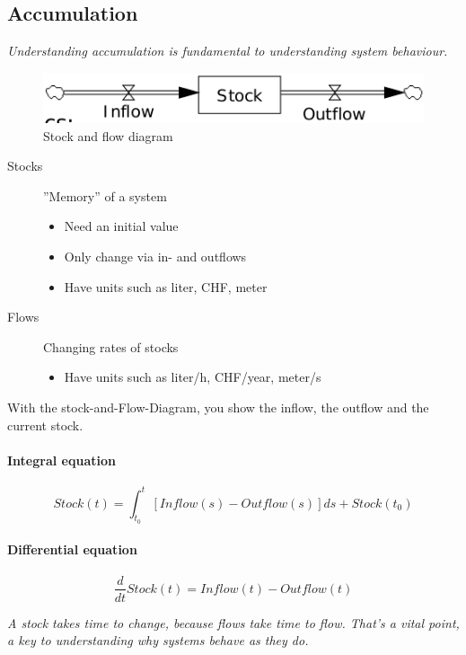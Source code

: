 \subsection{Accumulation}

\emph{Understanding accumulation is fundamental to understanding system
	behaviour.}

\begin{figure}[H]
	\centering
	\includegraphics[width=.5\textwidth]{figures/stocknflow.png}
	\caption{Stock and flow diagram}
\end{figure}

\begin{description}
	\item[Stocks] ''Memory'' of a system
	\begin{itemize}
		\tightlist
		\item Need an initial value
		\item Only change via in- and outflows
		\item Have units such as liter, CHF, meter
	\end{itemize}
	\item[Flows] Changing rates of stocks
	\begin{itemize}
		\tightlist
		\item Have units such as liter/h, CHF/year, meter/s
	\end{itemize}
\end{description}

With the stock-and-Flow-Diagram, you show the inflow, the outflow and
the current stock.


\paragraph{Integral equation}
\begin{equation}
Stock(t) = \int_{t_0}^{t}[Inflow(s)-Outflow(s)]ds + Stock(t_0)
\end{equation}

\paragraph{Differential equation}
\begin{equation}
\frac{d}{dt}Stock(t)=Inflow(t)-Outflow(t)
\end{equation}

\emph{A stock takes time to change, because flows take time to flow.
	That's a vital point, a key to understanding why systems behave as they
	do.}

